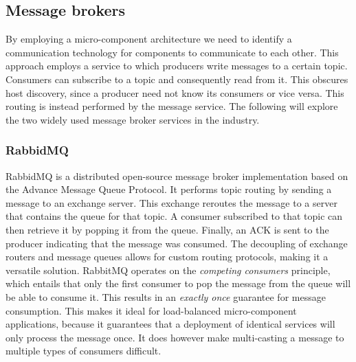 \subsection{Message brokers}
By employing a micro-component architecture we need to identify a communication technology for components to communicate to each other. This approach employs a service to which producers write messages to a certain topic. Consumers can subscribe to a topic and consequently read from it. This obscures host discovery, since a producer need not know its consumers or vice versa. This routing is instead performed by the message service. The following will explore the two widely used message broker services in the industry.

\subsubsection*{RabbidMQ}
RabbidMQ\cite{web:rabbidmg} is a distributed open-source message broker implementation based on the Advance Message Queue Protocol. It performs topic routing by sending a message to an exchange server. This exchange reroutes the message to a server that contains the queue for that topic. A consumer subscribed to that topic can then retrieve it by popping it from the queue. Finally, an ACK is sent to the producer indicating that the message was consumed. The decoupling of exchange routers and message queues allows for custom routing protocols, making it a versatile solution. RabbitMQ operates on the \emph{competing consumers} principle, which entails that only the first consumer to pop the message from the queue will be able to consume it. This results in an \emph{exactly once} guarantee for message consumption. This makes it ideal for load-balanced micro-component applications, because it guarantees that a deployment of identical services will only process the message once. It does however make multi-casting a message to multiple types of consumers difficult.

